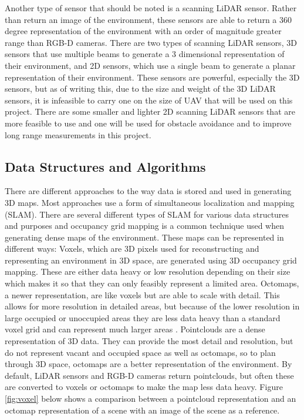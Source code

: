 \documentclass[12pt, letterpaper]{article}
\begin{document}
Another type of sensor that should be noted is a scanning LiDAR sensor. Rather than return an image of the environment, these sensors are able to return a 360 degree representation of the environment with an order of magnitude greater range than RGB-D cameras. There are two types of scanning LiDAR sensors, 3D sensors that use multiple beams to generate a 3 dimensional representation of their environment, and 2D sensors, which use a single beam to generate a planar representation of their environment. These sensors are powerful, especially the 3D sensors, but as of writing this, due to the size and weight of the 3D LiDAR sensors, it is infeasible to carry one on the size of UAV that will be used on this project. There are some smaller and lighter 2D scanning LiDAR sensors that are more feasible to use and one will be used for obstacle avoidance and to improve long range measurements in this project.
 
\subsection{Data Structures and Algorithms} 
There are different approaches to the way data is stored and used in generating 3D maps. Most approaches use a form of simultaneous localization and mapping (SLAM). There are several different types of SLAM for various data structures and purposes and occupancy grid mapping is a common technique used when generating dense maps of the environment. These maps can be represented in different ways:
Voxels, which are 3D pixels used for reconstructing and representing an environment in 3D space, are generated using 3D occupancy grid mapping. These are either data heavy or low resolution depending on their size which makes it so that they can only feasibly represent a limited area.
Octomaps, a newer representation, are like voxels but are able to scale with detail. This allows for more resolution in detailed areas, but because of the lower resolution in large occupied or unoccupied areas they are less data heavy than a standard voxel grid and can represent much larger areas \cite{Hornung2013}.
Pointclouds are a dense representation of 3D data. They can provide the most detail and resolution, but do not represent vacant and occupied space as well as octomaps, so to plan through 3D space, octomaps are a better representation of the environment. By default, LiDAR sensors and RGB-D cameras return pointclouds, but often these are converted to voxels or octomaps to make the map less data heavy.
Figure \ref{fig:voxel} below shows a comparison between a pointcloud representation and an octomap representation of a scene with an image of the scene as a reference.
\end{document}
